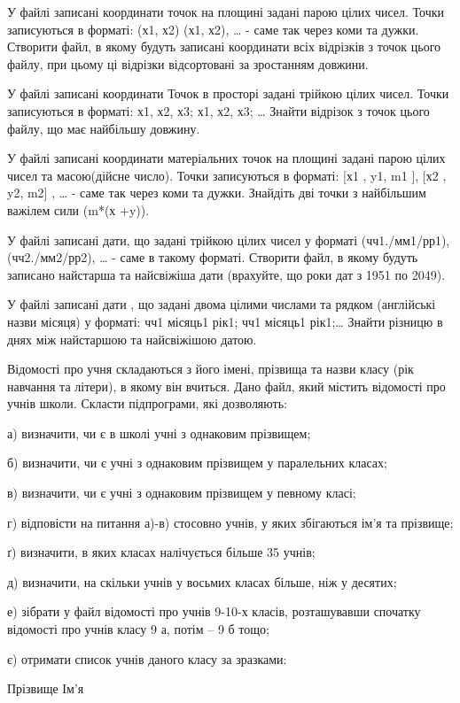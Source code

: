 \documentclass[]{article}
\begin{document}
У файлі записані координати точок на площині задані парою цілих чисел.
Точки записуються в форматі: (х1, х2) (х1, х2), \ldots{} - саме так
через коми та дужки. Створити файл, в якому будуть записані координати
всіх відрізків з точок цього файлу, при цьому ці відрізки відсортовані
за зростанням довжини.

У файлі записані координати Точок в просторі задані трійкою цілих чисел.
Точки записуються в форматі: х1, х2, х3; х1, х2, х3; \ldots{} Знайти
відрізок з точок цього файлу, що має найбільшу довжину.

У файлі записані координати матеріальних точок на площині задані парою
цілих чисел та масою(дійсне число). Точки записуються в форматі: {[}х1 ,
y1, m1 {]}, {[}х2 , y2, m2{]} , \ldots{} - саме так через коми та дужки.
Знайдіть дві точки з найбільшим важілем сили (m*(х +y)).

У файлі записані дати, що задані трійкою цілих чисел у форматі
(чч1./мм1/рр1),(чч2./мм2/рр2), \ldots{} - саме в такому форматі.
Створити файл, в якому будуть записано найстарша та найсвіжіша дати
(врахуйте, що роки дат з 1951 по 2049).

У файлі записані дати , що задані двома цілими числами та рядком
(англійські назви місяця) у форматі: чч1 місяць1 рік1; чч1 місяць1
рік1;\ldots{} Знайти різницю в днях між найстаршою та найсвіжішою датою.

Відомості про учня складаються з його імені, прізвища та назви класу
(рік навчання та літери), в якому він вчиться. Дано файл, який містить
відомості про учнів школи. Скласти підпрограми, які дозволяють:

а) визначити, чи є в школі учні з однаковим прізвищем;

б) визначити, чи є учні з однаковим прізвищем у паралельних класах;

в) визначити, чи є учні з однаковим прізвищем у певному класі;

г) відповісти на питання а)-в) стосовно учнів, у яких збігаються ім'я та
прізвище;

ґ) визначити, в яких класах налічується більше 35 учнів;

д) визначити, на скільки учнів у восьмих класах більше, ніж у десятих;

е) зібрати у файл відомості про учнів 9-10-х класів, розташувавши
спочатку відомості про учнів класу 9 а, потім -- 9 б тощо;

є) отримати список учнів даного класу за зразками:

Прізвище Ім'я
\end{document}
